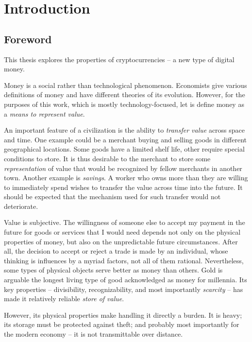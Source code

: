 \chapter{Introduction}

\label{Chapter01Introduction}

\section{Foreword}

This thesis explores the properties of cryptocurrencies -- a new type of digital money.


Money is a social rather than technological phenomenon.
Economists give various definitions of money and have different theories of its evolution. 
However, for the purposes of this work, which is mostly technology-focused, let is define money as a \textit{means to represent value}.

An important feature of a civilization is the ability to \textit{transfer value} across space and time.
One example could be a merchant buying and selling goods in different geographical locations.
Some goods have a limited shelf life, other require special conditions to store.
It is thus desirable to the merchant to store some \textit{representation} of value that would be recognized by fellow merchants in another town.
Another example is \textit{savings}.
A worker who owns more than they are willing to immediately spend wishes to transfer the value across time into the future.
It should be expected that the mechanism used for such transfer would not deteriorate.

Value is subjective.
The willingness of someone else to accept my payment in the future for goods or services that I would need depends not only on the physical properties of money, but also on the unpredictable future circumstances.
After all, the decision to accept or reject a trade is made by an individual, whose thinking is influences by a myriad factors, not all of them rational.
Nevertheless, some types of physical objects serve better as money than others.
Gold is arguable the longest living type of good acknowledged as money for millennia.
Its key properties -- divisibility, recognizability, and most importantly \textit{scarcity} -- has made it relatively reliable \textit{store of value}.

However, its physical properties make handling it directly a burden.
It is heavy; its storage must be protected against theft; and probably most importantly for the modern economy -- it is not transmittable over distance.

